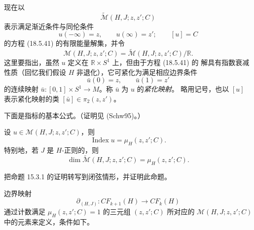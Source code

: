 现在以
\[
 \widetilde{\mathcal M}(H,J;z,z';C)
\]
表示满足渐近条件与同伦条件
\begin{equation}
 u(-\infty)=z,\qquad u(\infty)=z';\qquad [u]=C
\label{eq:19-floer-asymptotic-homotopy}
\end{equation}
的方程 (18.5.41) 的有限能量解集，并令
\[
 \mathcal M(H,J;z,z';C)
 =\widetilde{\mathcal M}(H,J;z,z';C)/\mathbb R.
\]
这里要指出，虽然 $u$ 定义在 $\mathbb R\times S^1$ 上，但由于方程 (18.5.41) 的
解具有指数衰减性质（回忆我们假设 $H$ 非退化），它可紧化为满足相应边界条件
\[
 \bar u(0)=z,\qquad\bar u(1)=z'
\]
的连续映射 $\bar u:[0,1]\times S^1\to M$。称 $\bar u$ 为 $u$ 的\emph{紧化映射}。
略用记号，也以 $[u]$ 表示紧化映射的类 $[\bar u]\in\pi_2(z,z')$。

下面是\personFredholm{}指标的基本公式。（证明见 (Schw95)。）

\begin{proposition}
\label{prop:closed-floer-index-formula}
设 $u\in\mathcal M(H,J;z,z';C)$，则
\begin{equation}
 \operatorname{Index}u=\mu_H(z,z';C).
\label{eq:19-closed-floer-index}
\end{equation}
特别地，若 $J$ 是 $H$-正则的，则
\[
 \dim\widetilde{\mathcal M}(H,J;z,z';C)=\mu_H(z,z';C).
\]
\end{proposition}

\begin{exercise}
\label{ex:closed-string-index-formula}
把命题 15.3.1 的证明转写到闭弦情形，并证明此命题。
\end{exercise}

\personFloer{}边界映射
\[
 \partial_{(H,J)}:CF_{k+1}(H)\longrightarrow CF_k(H)
\]
通过计数满足 $\mu_H(z,z';C)=1$ 的三元组 $(z,z';C)$ 所对应的
$\mathcal M(H,J;z,z';C)$ 中的元素来定义，条件如下。

